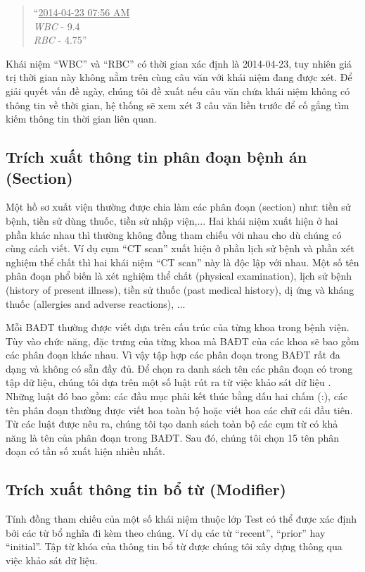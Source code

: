 \begin{quote}
``\underline{2014-04-23 07:56 AM}\\
\textit{WBC} - 9.4\\
\textit{RBC} - 4.75''
\end{quote}

Khái niệm ``WBC'' và ``RBC'' có thời gian xác định là 2014-04-23, tuy nhiên giá trị thời gian này không nằm trên cùng câu văn với khái niệm đang được xét. Để giải quyết vấn đề ngày, chúng tôi đề xuất nếu câu văn chứa khái niệm không có thông tin về thời gian, hệ thống sẽ xem xét 3 câu văn liền trước để cố gắng tìm kiếm thông tin thời gian liên quan.

\subsection*{Trích xuất thông tin phân đoạn bệnh án (Section)}
Một hồ sơ xuất viện thường được chia làm các phân đoạn (section) như: tiền sử bệnh, tiền sử dùng thuốc, tiền sử nhập viện,... Hai khái niệm xuất hiện ở hai phần khác nhau thì thường không đồng tham chiếu với nhau cho dù chúng có cùng cách viết. Ví dụ cụm “CT scan” xuất hiện ở phần lịch sử bệnh và phần xét nghiệm thể chất thì hai khái niệm “CT scan” này là độc lập với nhau. Một số tên phân đoạn phổ biến là xét nghiệm thể chất (physical examination), lịch sử bệnh (history of present illness), tiền sử thuốc (past medical history), dị ứng và kháng thuốc (allergies and adverse reactions), ...

Mỗi BAĐT thường được viết dựa trên cấu trúc của từng khoa trong bệnh viện. Tùy vào chức năng, đặc trưng của từng khoa mà BAĐT của các khoa sẽ bao gồm các phân đoạn khác nhau. Vì vậy tập hợp các phân đoạn trong BAĐT rất đa dạng và không có sẵn đầy đủ. Để chọn ra danh sách tên các phân đoạn có trong tập dữ liệu, chúng tôi dựa trên một số luật rút ra từ việc khảo sát dữ liệu \cite{RandolphMiller2008}. Những luật đó bao gồm: các đầu mục phải kết thúc bằng dấu hai chấm (:), các tên phân đoạn thường được viết hoa toàn bộ hoặc viết hoa các chữ cái đầu tiên. Từ các luật được nêu ra, chúng tôi tạo danh sách toàn bộ các cụm từ có khả năng là tên của phân đoạn trong BAĐT. Sau đó, chúng tôi chọn 15 tên phân đoạn có tần số xuất hiện nhiều nhất.

\subsection*{Trích xuất thông tin bổ từ (Modifier)}
Tính đồng tham chiếu của một số khái niệm thuộc lớp Test có thể được xác định bởi các từ bổ nghĩa đi kèm theo chúng. Ví dụ các từ “recent”, “prior” hay “initial”. Tập từ khóa của thông tin bổ từ được chúng tôi xây dựng thông qua việc khảo sát dữ liệu.

